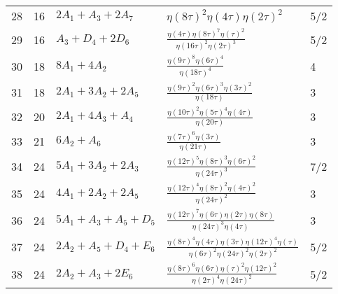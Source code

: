 \documentclass{amsart}
\theoremstyle{definition}
\begin{document}
\begin{longtable}{|l|l|l|l|l|}
  28 & 16 & $2 A_{1} +  A_{3} + 2 A_{7}$ & $ \eta \left( 8\tau \right)   ^{2}\eta \left( 4\tau \right)   \eta \left( 2\tau \right)   ^{2}$ & 5/2 \\ 
  29 & 16 & $ A_{3} +  D_{4} + 2 D_{6}$ & ${\frac {\eta \left( 4\tau \right)   \eta \left( 8\tau \right)   ^{7}  \eta \left( \tau \right)   ^{2}}{  \eta \left( 16\tau \right)   ^{2} \mbox{}  \eta \left( 2\tau \right)   ^{3}}}$ & 5/2 \\ 
  30 & 18 & $8 A_{1} + 4 A_{2}$ & ${\frac {  \eta \left( 9\tau \right)   ^{8}  \eta \left( 6\tau \right)   ^{4}}{  \eta \left( 18\tau \right)   ^{4}}}$ & 4 \\ 
  31 & 18 & $2 A_{1} + 3 A_{2} + 2 A_{5}$ & ${\frac {  \eta \left( 9\tau \right)   ^{2}  \eta \left( 6\tau \right)   ^{3}  \eta \left( 3\tau \right)   ^{2} \mbox{}}{\eta \left( 18\tau \right) }}$ & 3 \\ 
  32 & 20 & $2 A_{1} + 4 A_{3} +  A_{4}$ & ${\frac {  \eta \left( 10\tau \right)   ^{2}  \eta \left( 5\tau \right)   ^{4}\eta \left( 4\tau \right) }{\eta \left( 20 \mbox{}\tau \right) }}$ & 3 \\ 
  33 & 21 & $6 A_{2} +  A_{6}$ & ${\frac {  \eta \left( 7\tau \right)   ^{6}\eta \left( 3\tau \right) }{\eta \left( 21\tau \right) }}$ & 3 \\ 
  34 & 24 & $5 A_{1} + 3 A_{2} + 2 A_{3}$ & ${\frac {  \eta \left( 12\tau \right)   ^{5}  \eta \left( 8\tau \right)   ^{3}  \eta \left( 6\tau \right)   ^{2} \mbox{}}{  \eta \left( 24\tau \right)   ^{3}}}$ & 7/2 \\ 
  35 & 24 & $4 A_{1} + 2 A_{2} + 2 A_{5}$ & ${\frac {  \eta \left( 12\tau \right)   ^{4}  \eta \left( 8\tau \right)   ^{2}  \eta \left( 4\tau \right)   ^{2} \mbox{}}{  \eta \left( 24\tau \right)   ^{2}}}$ & 3 \\ 
  36 & 24 & $5 A_{1} +  A_{3} +  A_{5} +  D_{5}$ & ${\frac {  \eta \left( 12\tau \right)   ^{7}\eta \left( 6\tau \right) \eta \left( 2\tau \right) \eta \left( 8\tau \right) }{  \eta \left( 24\tau \right)   ^{3} \mbox{}\eta \left( 4\tau \right) }}$ & 3 \\ 
  37 & 24 & $2 A_{2} +  A_{5} +  D_{4} +  E_{6}$ & ${\frac {  \eta \left( 8\tau \right)   ^{4}\eta \left( 4\tau \right) \eta \left( 3\tau \right)   \eta \left( 12\tau \right)   ^{4} \mbox{}\eta \left( \tau \right) }{  \eta \left( 6\tau \right)   ^{2}  \eta \left( 24\tau \right)   ^{2}  \eta \left( 2\tau \right)   ^{2}}}$ & 5/2 \\ 
  38 & 24 & $2 A_{2} +  A_{3} + 2 E_{6}$ & ${\frac {  \eta \left( 8\tau \right)   ^{6}\eta \left( 6\tau \right)   \eta \left( \tau \right)   ^{2}  \eta \left( 12\tau \right)   ^{2} \mbox{}}{  \eta \left( 2\tau \right)   ^{4}  \eta \left( 24\tau \right)   ^{2}}}$ & 5/2 \\ 

\end{longtable}
\end{document}
